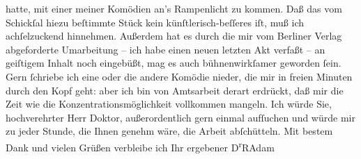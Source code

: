 \begin{ledgroupsized}[t]{13cm}
                    hatte, mit einer meiner Komödien an’s Rampenlicht zu kommen. Daß das vom
                    Schickſal hiezu beſtimmte Stück kein künſtlerisch-beſſeres iſt, muß ich achſelzuckend hinnehmen.
                    Außerdem hat es durch die mir vom Berliner Verlag abgeforderte
                    Umarbeitung – ich habe einen neuen letzten Akt verfaßt – an geiſtigem Inhalt
                    noch eingebüßt, mag es auch bühnenwirkſamer geworden ſein.\pend
           \pstart
           Gern ſchriebe ich eine oder die andere Komödie {\pb}nieder, die mir in freien Minuten
                    durch den Kopf geht: aber ich bin von Amtsarbeit derart erdrückt, daß mir die
                    Zeit wie die Konzentrationsmöglichkeit vollkommen mangeln.\pend
           \pstart
           Ich würde Sie, hochverehrter Herr Doktor, außerordentlich gern einmal aufſuchen
                    und würde mir zu jeder Stunde, die Ihnen genehm wäre, die Arbeit
                    abſchütteln.\pend
           \pstart
           Mit bestem Dank und vielen Grüßen verbleibe ich Ihr ergebener\pend
           \pstart \spacefill\mbox{D\textsuperscript{r}RAdam}\pend{}
         
         \endnumbering{}\end{ledgroupsized}  \newcommand{\dateiname}{L02538}\newcommand{\titel}{Robert Adam an Arthur Schnitzler, 15. 6. 1930}\newcommand{\editorInnen}{Martin Anton Müller und Gerd-Hermann Susen}
      